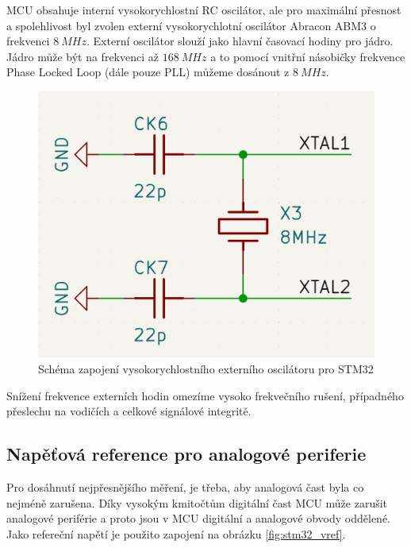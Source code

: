 MCU obsahuje interní vysokorychlostní RC oscilátor, ale pro maximální přesnost a spolehlivost byl zvolen externí vysokorychlotní oscilátor Abracon ABM3 o frekvenci  $8 \ MHz$. Externí oscilátor slouží jako hlavní časovací hodiny pro
jádro. Jádro může být na frekvenci až $168 \ MHz$ a to pomocí vnitřní násobičky frekvence Phase Locked Loop (dále pouze PLL) můžeme dosánout z $8 \ MHz$.

\begin{figure}[H]
    \centering
    \includegraphics[width=0.8\linewidth]{pictures/stm32_hse.jpg}
    \caption{Schéma zapojení vysokorychlostního externího oscilátoru pro STM32}
    \label{fig:stm32_hse}
\end{figure}

Snížení frekvence externích hodin omezíme vysoko frekvečního rušení, případného přeslechu na vodičích a celkové signálové integritě.


\subsection{Napěťová reference pro analogové periferie} \label{section:vref}
Pro dosáhnutí nejpřesnějšího měření, je třeba, aby analogová čast byla co nejméně zarušena. Díky vysokým kmitočtům digitální čast MCU může zarušit analogové periférie a proto jsou v MCU digitální a analogové obvody oddělené.
Jako refereční napětí je použito zapojení na obrázku \ref{fig:stm32_vref}.

